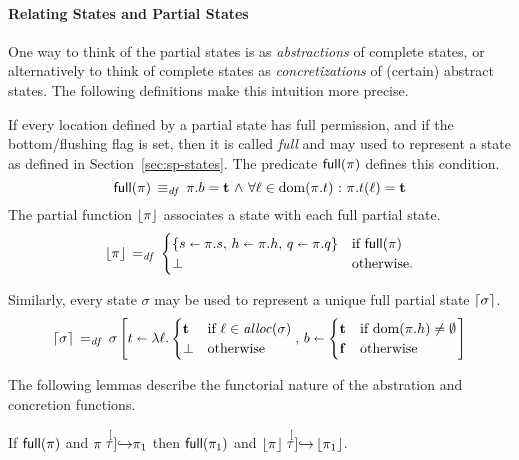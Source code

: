 \documentclass[11pt]{report}
\begin{document}
\paragraph{Relating States and Partial States}

One way to think of the partial states is as \emph{abstractions} of complete states, or alternatively to think of complete states as \emph{concretizations} of (certain) abstract states. The following definitions make this intuition more precise. 

If every location defined by a partial state has full permission, and if the bottom/flushing flag is set, then it is called \emph{full} and may used to represent a state as defined in Section~\ref{sec:sp-states}. The predicate $\mathsf{full}(\pi)$ defines this condition. \begin{equation}
	\mathsf{full}(\pi)  \operatorname{\;\equiv_{\mathit{df}}\;}   \pi.b = \mathbf{t} \operatorname{\,\wedge\,} \forall \ell \in \operatorname{\mathrm{dom}}(\pi.t) \operatorname{\,:\,} \pi.t(\ell) = \mathbf{t} 
\end{equation}
The partial function $\left\lfloor\pi\right\rfloor$ associates a state with each full partial state. \begin{equation}
	\left\lfloor\pi\right\rfloor \operatorname{\;=_{\mathit{df}}\;} \begin{cases}
		\left\lbrace s \shortleftarrow \pi.s,\,h \shortleftarrow \pi.h,\,q \shortleftarrow \pi.q \right\rbrace & \text{if $\mathsf{full}(\pi)$} \\
		\bot & \text{otherwise.}
	\end{cases}
\end{equation}

Similarly, every state $\sigma$ may be used to represent a unique full partial state $\left\lceil\sigma\right\rceil$. \begin{equation}
	\left\lceil\sigma\right\rceil \operatorname{\;=_{\mathit{df}}\;} \sigma \left[ t \shortleftarrow \lambda \ell . \begin{cases}
		\mathbf{t} & \text{if $\ell \in \mathit{alloc}(\sigma)$} \\
		\bot & \text{otherwise}
	\end{cases},\, b \shortleftarrow \begin{cases}
		\mathbf{t} & \text{if $\operatorname{\mathrm{dom}}(\pi.h) \neq \operatorname{\emptyset}$} \\
		\mathbf{f} & \text{otherwise}
	\end{cases} \right]
\end{equation}

The following lemmas describe the functorial nature of the abstration and concretion functions. 

\begin{lemma}
	\label{lem:concst-tau}
	If $\mathsf{full}(\pi)$ and $\pi \stackrel[\tau]{}{\operatorname{\hookrightarrow}} \pi_1$ then $\mathsf{full}(\pi_1)$ and $\left\lfloor\pi\right\rfloor \stackrel[\tau]{}{\operatorname{\hookrightarrow}} \left\lfloor\pi_1\right\rfloor$. 
\end{lemma}
\end{document}
